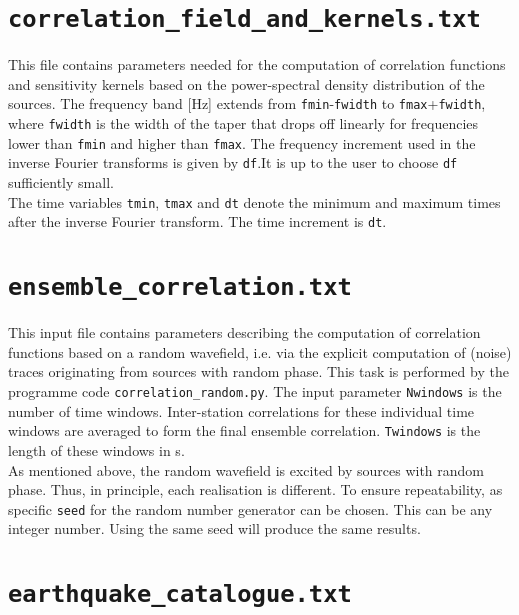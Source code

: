 \section{\texttt{correlation\_field\_and\_kernels.txt}}

This file contains parameters needed for the computation of correlation functions and sensitivity kernels based on the power-spectral density distribution of the sources. The frequency band [Hz] extends from \texttt{fmin}-\texttt{fwidth} to \texttt{fmax}+\texttt{fwidth}, where \texttt{fwidth} is the width of the taper that drops off linearly for frequencies lower than \texttt{fmin} and higher than \texttt{fmax}. The frequency increment used in the inverse Fourier transforms is given by \texttt{df}.It is up to the user to choose \texttt{df} sufficiently small.\\[5pt]
%
The time variables \texttt{tmin}, \texttt{tmax} and \texttt{dt} denote the minimum and maximum times after the inverse Fourier transform. The time increment is \texttt{dt}.

\section{\texttt{ensemble\_correlation.txt}}

This input file contains parameters describing the computation of correlation functions based on a random wavefield, i.e. via the explicit computation of (noise) traces originating from sources with random phase. This task is performed by the programme code \texttt{correlation\_random.py}. The input parameter \texttt{Nwindows} is the number of time windows. Inter-station correlations for these individual time windows are averaged to form the final ensemble correlation. \texttt{Twindows} is the length of these windows in s.\\[5pt]
%
As mentioned above, the random wavefield is excited by sources with random phase. Thus, in principle, each realisation is different. To ensure repeatability, as specific \texttt{seed} for the random number generator can be chosen. This can be any integer number. Using the same seed will produce the same results. 

\section{\texttt{earthquake\_catalogue.txt}}

